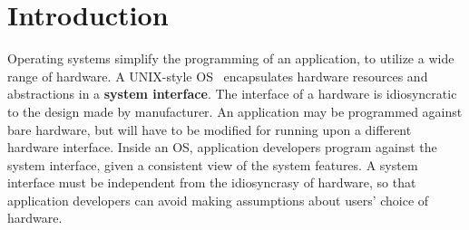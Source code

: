 \chapter{Introduction}
\label{chap:intro}


Operating systems simplify the programming of an application, to utilize a wide range of hardware.
A UNIX-style OS~\cite{ritchie74unix}
encapsulates hardware resources and abstractions in a {\bf system interface}.
The interface of a hardware
is idiosyncratic to the design made by manufacturer.
An application may be programmed against bare hardware, but will have to be modified for running upon a different hardware interface.
Inside an OS, application developers program against the system interface, given a consistent view of the system features.
A system interface must be independent from the idiosyncrasy of hardware,
so that application developers can avoid making assumptions about users' choice of hardware.



















